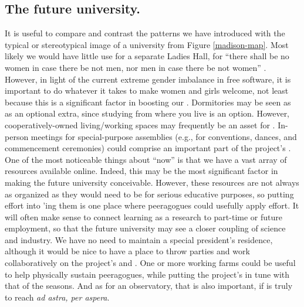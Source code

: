 \subsection{The future university.}
It is useful to compare and contrast the patterns we have introduced
with the typical or stereotypical image of a university from Figure
\ref{madison-map}.  Most likely we would have little use for a
separate Ladies Hall, for ``there shall be no women in case there be
not men, nor men in case there be not women'' \cite[Chapter
  1.LII]{rabelais1894gargantua}.  However, in light of the current
extreme gender imbalance in free software, it is important to do
whatever it takes to make women and girls welcome, not least because
this is a significant factor in boosting our .  Dormitories may be seen as as an optional extra, since
studying from where you live is an option.  However,
cooperatively-owned living/working spaces may frequently be an asset
for .  In-person meetings for
special-purpose assemblies (e.g., for conventions, dances, and
commencement ceremonies) could comprise an important part of the
project's .  One of the most noticeable things
about ``now'' is that we have a vast array of resources available
online.  Indeed, this may be the most significant factor in making the
future university conceivable.  However, these resources are not
always as organized as they would need to be for serious educative
purposes, so putting effort into 'ing them is one place where peeragogues could usefully
apply effort.  It will often make sense to connect learning as a
research  to part-time or future employment, so
that the future university may see a closer coupling of science and
industry.  We have no need to maintain a special president's
residence, although it would be nice to have a place to throw parties
and work collaboratively on the project's  and
.  One or more working farms could be useful to
help physically sustain peeragogues, while putting the project's
 in tune with that of the seasons.  And as for
an observatory, that is also important, if  is
truly to reach \emph{ad astra, per aspera}.
